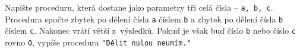 \question[50]
Napište proceduru, která dostane jako parametry tři celá čísla -- \texttt{a, b,
	c}. Procedura spočte zbytek po dělení čísla \texttt{a} číslem \texttt{b} a
zbytek po dělení čísla \texttt{b} číslem \texttt{c}. Nakonec vrátí větší
z~výsledků. Pokud je však buď číslo \texttt{b} nebo číslo \texttt{c} rovno
\texttt{0}, vypíše procedura \texttt{"Dělit nulou neumím."}